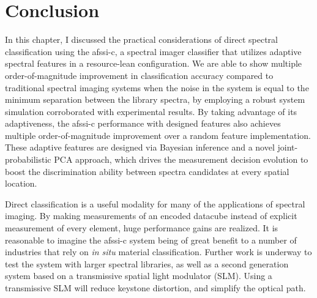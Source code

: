 \section{Conclusion}

In this chapter, I discussed the practical considerations of direct spectral classification using the \gls{afssi-c}, a spectral imager classifier that utilizes adaptive spectral features in a resource-lean configuration. We are able to show multiple order-of-magnitude improvement in classification accuracy compared to traditional spectral imaging systems when the noise in the system is equal to the minimum separation between the library spectra, by employing a robust system simulation corroborated with experimental results. By taking advantage of its adaptiveness, the \gls{afssi-c} performance with designed features also achieves multiple order-of-magnitude improvement over a random feature implementation. These adaptive features are designed via Bayesian inference and a novel joint-probabilistic PCA approach, which drives the measurement decision evolution to boost the discrimination ability between spectra candidates at every spatial location. 


Direct classification is a useful modality for many of the applications of spectral imaging. By making measurements of an encoded datacube instead of explicit measurement of every element, huge performance gains are realized. It is reasonable to imagine the \gls{afssi-c} system being of great benefit to a number of industries that rely on \textit{in situ} material classification. Further work is underway to test the system with larger spectral libraries, as well as a second generation system based on a transmissive spatial light modulator (SLM). Using a transmissive SLM will reduce keystone distortion, and simplify the optical path.
